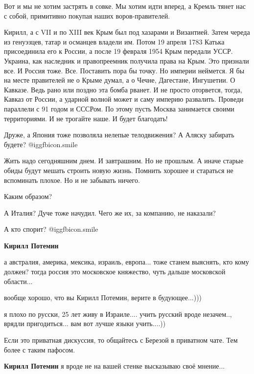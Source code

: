 \begin{itemize}
Вот и мы не хотим застрять в совке. Мы хотим идти вперед, а Кремль тянет нас с
собой, примитивно покупая наших воров-правителей.


Кирилл, а с VII и по XIII век Крым был под хазарами и Византией. Затем череда
из генуэзцев, татар и османцев владели им. Потом 19 апреля 1783 Катька
присоединила его к России, а после 19 февраля 1954 Крым передали УССР. Украина,
как наследник и правопреемник получила права на Крым. Это признали все. И
Россия тоже. Все. Поставить пора бы точку. Но империи неймется. Я бы на месте
правителей не о Крыме думал, а о Чечне, Дагестане, Ингушетии. О Кавказе. Ведь
рано или поздно эта бомба рванет. И не просто оторвется, тогда, Кавказ от
России, а ударной волной может и саму империю развалить. Проведи параллели с 91
годом и СССРом. По этому пусть Москва занимается своими территориями. И не
трогайте наше. И будет благодать!


Друже, а Япония тоже позволяла нелепые телодвижения? А Аляску забирать будете?  @igg{fbicon.smile} 

Жить надо сегодняшним днем. И завтрашним. Но не прошлым. А иначе старые обиды
будут мешать строить новую жизнь. Помнить хорошее и стараться не вспоминать
плохое. Но и не забывать ничего.


Каким образом?

А Италия? Дуче тоже начудил. Чего же их, за компанию, не наказали?

А кто спорит?  @igg{fbicon.smile} 

\textbf{Кирилл Потемин} 

а австралия, америка, мексика, израиль, европа... тоже станем выяснять, кто кому
должен? тогда россия это московское княжество, чуть дальше московской области...

вообще хорошо, что вы Кирилл Потемин, верите в будующее...)))


я плохо по русски, 25 лет живу в Израиле.... учить русский вроде незачем.., врядли
пригодиться... вам вот лучше языки учить....))


Если это приватная дискуссия, то общайтесь с Березой в приватном чате. Тем более с таким пафосом.

\textbf{Кирилл Потемин} я вроде не на вашей стенке высказываю своё мнение...


\end{itemize}
